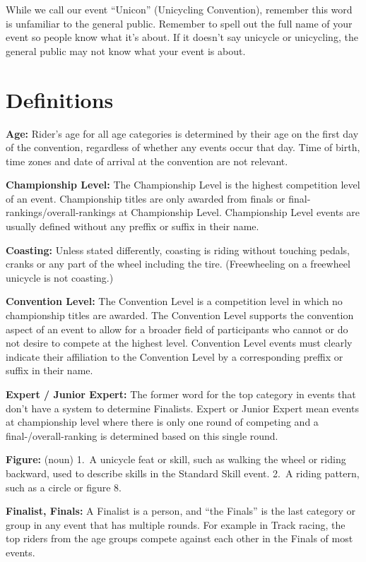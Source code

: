 While we call our event ``Unicon'' (Unicycling Convention), remember this word is unfamiliar to the general public.
Remember to spell out the full name of your event so people know what it's about.
If it doesn't say unicycle or unicycling, the general public may not know what your event is about.

\section{Definitions \label{chap:general_definitions}}

\textbf{Age:} Rider's age for all age categories is determined by their age on the first day of the convention, regardless of whether any events occur that day.
Time of birth, time zones and date of arrival at the convention are not relevant.

\textbf{Championship Level:} The Championship Level is the highest competition level of an event.
Championship titles are only awarded from finals or final-rankings/overall-rankings at Championship Level.
Championship Level events are usually defined without any preffix or suffix in their name.

\textbf{Coasting:} Unless stated differently, coasting is riding without touching pedals, cranks or any part of the wheel including the tire.
(Freewheeling on a freewheel unicycle is not coasting.)

\textbf{Convention Level:} The Convention Level is a competition level in which no championship titles are awarded.
The Convention Level supports the convention aspect of an event to allow for a broader field of participants who cannot or do not desire to compete at the highest level.
Convention Level events must clearly indicate their affiliation to the Convention Level by a corresponding preffix or suffix in their name.

\textbf{Expert / Junior Expert:} The former word for the top category in events that don't have a system to determine Finalists.
Expert or Junior Expert mean events at championship level where there is only one round of competing and a final-/overall-ranking is determined based on this single round.

\textbf{Figure:} (noun) 1.~A unicycle feat or skill, such as walking the wheel or riding backward, used to describe skills in the Standard Skill event.
2.~A riding pattern, such as a circle or figure 8.

\textbf{Finalist, Finals:} A Finalist is a person, and ``the Finals'' is the last category or group in any event that has multiple rounds.
For example in Track racing, the top riders from the age groups compete against each other in the Finals of most events.

